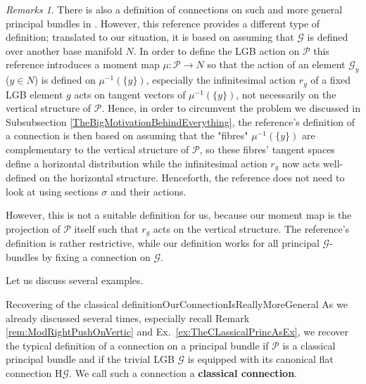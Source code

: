 \documentclass[a4paper,oneside,11pt,bibliography=totoc]{scrartcl}
\theoremstyle{plain}
\theoremstyle{remark}
\newtheorem{remark}[theorem]{Remarks}
\theoremstyle{definition}
\begin{document}
\begin{remark}
\leavevmode\newline
There is also a definition of connections on such and more general principal bundles in \cite[\S 5.7, paragraph before Prop.\ 5.38, page 148]{GroupoidBasedPrincipalBundles}. However, this reference provides a different type of definition; translated to our situation, it is based on assuming that $\mathcal{G}$ is defined over another base manifold $N$. In order to define the LGB action on $\mathcal{P}$ this reference introduces a moment map $\mu: \mathcal{P} \to N$ so that the action of an element $\mathcal{G}_y$ ($y \in N$) is defined on $\mu^{-1}(\{y\})$, especially the infinitesimal action $r_g$ of a fixed LGB element $g$ acts on tangent vectors of $\mu^{-1}(\{y\})$, not necessarily on the vertical structure of $\mathcal{P}$. Hence, in order to circumvent the problem we discussed in Subsubsection \ref{TheBigMotivationBehindEverything}, the reference's definition of a connection is then based on assuming that the "fibres" $\mu^{-1}(\{y\})$ are complementary to the vertical structure of $\mathcal{P}$, so these fibres' tangent spaces define a horizontal distribution while the infinitesimal action $r_g$ now acts well-defined on the horizontal structure. Henceforth, the reference does not need to look at using sections $\sigma$ and their actions.

However, this is not a suitable definition for us, because our moment map is the projection of $\mathcal{P}$ itself such that $r_g$ acts on the vertical structure. The reference's definition is rather restrictive, while our definition works for all principal $\mathcal{G}$-bundles by fixing a connection on $\mathcal{G}$.
\end{remark}

Let us discuss several examples.

\begin{examples}{Recovering of the classical definition}{OurConnectionIsReallyMoreGeneral}
As we already discussed several times, especially recall Remark \ref{rem:ModRightPushOnVertic} and Ex.\ \ref{ex:TheCLassicalPrincAsEx}, we recover the typical definition of a connection on a principal bundle if $\mathcal{P}$ is a classical principal bundle and if the trivial LGB $\mathcal{G}$ is equipped with its canonical flat connection $\mathrm{H}\mathcal{G}$. We call such a connection a \textbf{classical connection}.
\end{examples}
\end{document}
